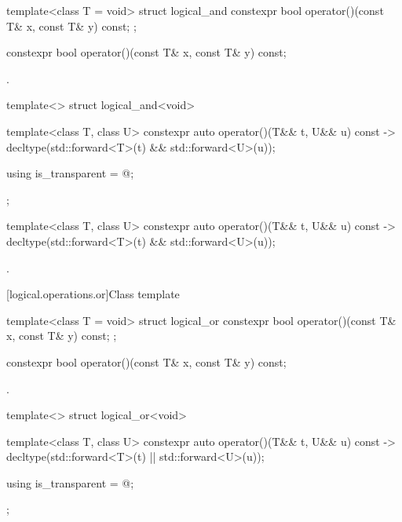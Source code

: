 %
\begin{itemdecl}
template<class T = void> struct logical_and {
  constexpr bool operator()(const T& x, const T& y) const;
};
\end{itemdecl}

%
\begin{itemdecl}
constexpr bool operator()(const T& x, const T& y) const;
\end{itemdecl}

\begin{itemdescr}
\pnum
\returns
{}.
\end{itemdescr}

%
\begin{itemdecl}
template<> struct logical_and<void> {
  template<class T, class U> constexpr auto operator()(T&& t, U&& u) const
    -> decltype(std::forward<T>(t) && std::forward<U>(u));

  using is_transparent = @\unspec@;
};
\end{itemdecl}

%
\begin{itemdecl}
template<class T, class U> constexpr auto operator()(T&& t, U&& u) const
  -> decltype(std::forward<T>(t) && std::forward<U>(u));
\end{itemdecl}

\begin{itemdescr}
\pnum
\returns
{}.
\end{itemdescr}

[logical.operations.or]{Class template }

%
\begin{itemdecl}
template<class T = void> struct logical_or {
  constexpr bool operator()(const T& x, const T& y) const;
};
\end{itemdecl}

%
\begin{itemdecl}
constexpr bool operator()(const T& x, const T& y) const;
\end{itemdecl}

\begin{itemdescr}
\pnum
\returns
{}.
\end{itemdescr}

%
\begin{itemdecl}
template<> struct logical_or<void> {
  template<class T, class U> constexpr auto operator()(T&& t, U&& u) const
    -> decltype(std::forward<T>(t) || std::forward<U>(u));

  using is_transparent = @\unspec@;
};
\end{itemdecl}

